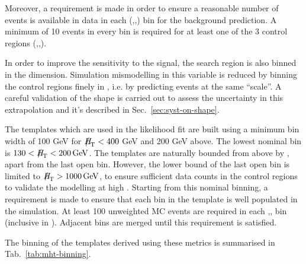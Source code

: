 Moreover, a requirement is made in order to ensure a reasonable number of events is available in data 
in each (\njet,\nb,\scalht) bin for the background prediction. 
A minimum of 10 events in every bin is required for at least one of the 3 control regions (\mj,\mmj,\gj). 

In order to improve the sensitivity to the signal, the search region is also binned in the \MHT dimension. 
Simulation mismodelling in this variable is reduced by binning the control regions finely in \scalht, i.e. by predicting 
events at the same ``scale''. A careful validation of the \MHT shape is carried out to assess 
the uncertainty in this extrapolation and it's described in Sec.~\ref{sec:syst-on-shape}. 

The \MHT templates which are used in the likelihood fit are built
using a minimum bin width of 100 GeV for $\MHT<400$ GeV and 200 GeV
above. The lowest nominal bin is $130<\MHT<200\,\mathrm{GeV}$. The
\MHT templates are naturally bounded from above by \scalht, apart from
the last open \scalht bin. However, the lower bound of the last open
bin is limited to $\MHT>1000\,\mathrm{GeV}$, to ensure sufficient data
counts in the control regions to validate the modelling at high \mht. 
Starting from this nominal binning, a requirement is made to ensure
that each bin in the template is well populated in the simulation.  At
least 100 unweighted MC events are required in each \njet,\scalht,\MHT
bin (inclusive in \nb). Adjacent \mht bins are merged until this
requirement is satisfied. 

The binning of the \MHT templates derived using these metrics is summarised in Tab.~\ref{tab:mht-binning}.


